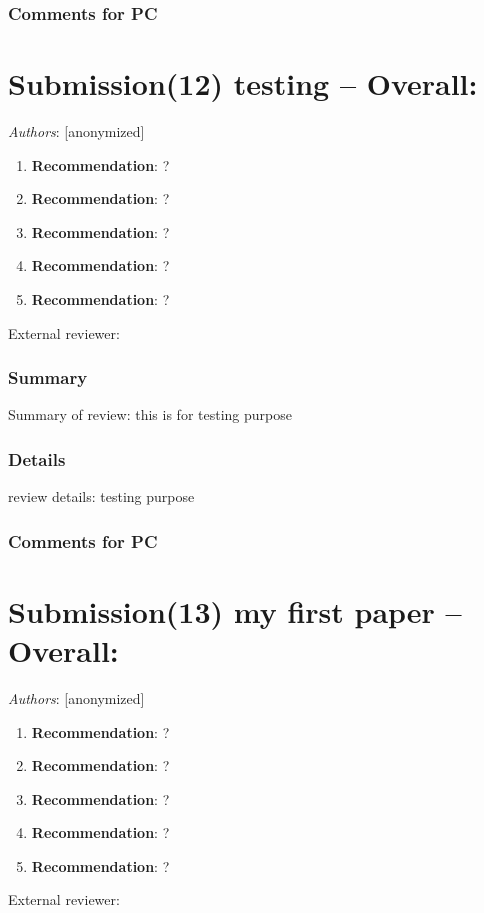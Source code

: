 \documentclass{article}
\begin{document}
   \subsubsection*{Comments for PC}
   

  

\section{Submission(12) testing -- Overall: }  

\textit{Authors}: [anonymized]

     
\begin{enumerate}
    
      \item \textbf{Recommendation}: ?
      \item \textbf{Recommendation}: ?
      \item \textbf{Recommendation}: ?
      \item \textbf{Recommendation}: ?
      \item \textbf{Recommendation}: ?
 \end{enumerate}
External reviewer:      
   \subsubsection*{Summary}
   Summary of review: this is for testing purpose
      
   \subsubsection*{Details}
   review details: testing purpose

   \subsubsection*{Comments for PC}
   

 

\section{Submission(13) my first paper -- Overall: }  

\textit{Authors}: [anonymized]

     
\begin{enumerate}
    
      \item \textbf{Recommendation}: ?
      \item \textbf{Recommendation}: ?
      \item \textbf{Recommendation}: ?
      \item \textbf{Recommendation}: ?
      \item \textbf{Recommendation}: ?
 \end{enumerate}
External reviewer:      
\end{document}
